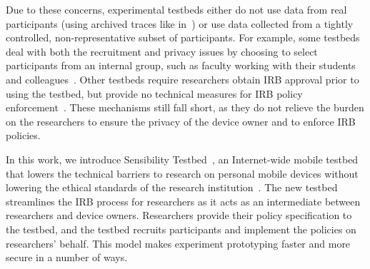 Due to these concerns, experimental testbeds either do not use data 
from real participants (using archived traces like 
in~\cite{kapadia2008anonysense}) or use data collected 
from a tightly controlled, non-representative subset of participants.
For example, some testbeds deal with both
the recruitment and privacy issues by choosing to select participants
from an internal group, such as faculty working with their students
and colleagues~\cite{hao2013isleep, wang2012no, wang2013sensing}. 
Other testbeds require researchers obtain IRB approval prior to using the
testbed, but provide no technical measures for IRB policy 
enforcement~\cite{phonelab, nandugudi2013phonelab}. 
These mechanisms still fall short, as they do not 
relieve the burden on the researchers to ensure the privacy of the
device owner and to enforce IRB policies. 

In this work, we introduce Sensibility Testbed~\cite{sensibility,
zhuang2015privacy}, an Internet-wide mobile testbed that 
lowers the technical barriers to research on personal mobile
devices without lowering the ethical standards of the research
institution~\cite{zevenbergen2013ethical}.  
The new testbed streamlines the IRB process for researchers as it acts 
as an intermediate between researchers and device owners. 
Researchers provide their policy specification to the testbed, and 
the testbed recruits participants and implement the policies on researchers' 
behalf. This model 
makes experiment prototyping faster and more secure in a number of ways. 

